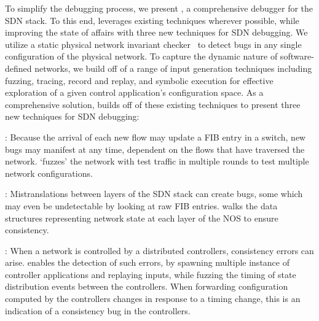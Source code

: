 To simplify the debugging process, we present \projectname{}, a comprehensive debugger for the SDN stack.
To this end, \projectname{} leverages existing techniques wherever possible, while improving the state of affairs
with three new techniques for SDN debugging. We utilize a static physical network invariant
checker~\cite{anteater} to detect bugs in any single configuration of the
physical network. To capture the dynamic nature of software-defined networks,
we build off of a range of input generation techniques including fuzzing, tracing, record and
replay, and symbolic execution for effective exploration of a given control
application's configuration space. 
As a comprehensive solution, \projectname{} builds off of these existing techniques to present
 three new techniques for SDN debugging:

:  Because the arrival of each new flow may update a FIB entry in a switch,
 new bugs may
manifest at any time, dependent on the flows that have traversed the network. \projectname{} `fuzzes' the network with 
test traffic in multiple rounds to test multiple network configurations.

: Mistranslations between layers of the SDN stack can create bugs, some which
may even be undetectable by looking at raw FIB entries. \projectname{} walks the data structures representing network state
at each layer of the NOS to ensure consistency.

: When a network is controlled by a distributed controllers, consistency
errors can arise. \projectname{} enables the detection of such errors, by spawning multiple instance of controller
applications and replaying inputs, while fuzzing the timing of state distribution events between the controllers. When forwarding
configuration computed by the controllers changes in response to a timing change, this is an indication of a consistency
bug in the controllers.


